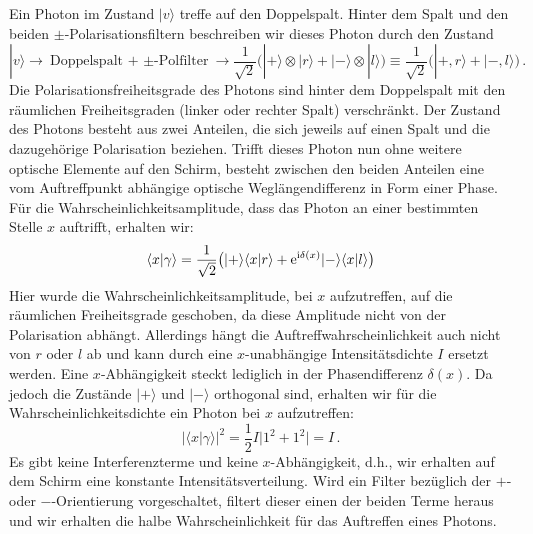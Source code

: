 Ein Photon im Zustand $|v\rangle$ treffe auf den Doppelspalt. Hinter dem Spalt und den beiden
$\pm$-Polarisationsfiltern beschreiben wir dieses Photon durch den Zustand
\begin{equation}
\label{eq_DSsingle1}
          |v \rangle \longrightarrow \mbox{Doppelspalt + $\pm$-Polfilter} \longrightarrow 
              \frac{1}{\sqrt{2}} \big(  |+\rangle \otimes |r\rangle + |-\rangle \otimes |l\rangle \big) 
              \equiv \frac{1}{\sqrt{2}} \big(  |+ , r\rangle + |- , l\rangle \big)   \, .
\end{equation}
Die Polarisationsfreiheitsgrade des Photons sind hinter dem Doppelspalt mit den
r\"aumlichen Freiheitsgraden (linker oder rechter Spalt) verschr\"ankt. Der Zustand des Photons
besteht aus zwei Anteilen, die sich jeweils auf einen Spalt und die dazugeh\"orige Polarisation
beziehen. Trifft dieses Photon nun ohne weitere optische Elemente auf den Schirm,
besteht zwischen den beiden Anteilen eine vom Auftreffpunkt abh\"angige optische 
Wegl\"angendifferenz in Form einer Phase. F\"ur die Wahr\-schein\-lich\-keits\-ampli\-tude, dass das Photon
an einer bestimmten Stelle $x$ auftrifft, erhalten wir:
\begin{equation}
\label{eq_DSsingle2}
   \langle x | \gamma \rangle = \frac{1}{\sqrt{2}}
               \big(  |+ \rangle \langle x | r\rangle +{\rm e}^{{\rm i}\delta(x)} |- \rangle \langle x  | l\rangle \big)
\end{equation}
Hier wurde die Wahrscheinlichkeitsamplitude, bei $x$ aufzutreffen, auf die r\"aumlichen Freiheitsgrade 
geschoben, da diese Amplitude nicht von der Polarisation abh\"angt. Allerdings h\"angt die
Auftreffwahrscheinlichkeit auch nicht von $r$ oder $l$ ab und kann durch eine $x$-unabh\"angige
Intensit\"atsdichte $I$ ersetzt werden. Eine $x$-Abh\"angigkeit steckt lediglich in der
Phasendifferenz $\delta(x)$. Da jedoch die Zust\"ande $|+\rangle$ und $|-\rangle$
orthogonal sind, erhalten wir f\"ur die Wahrscheinlichkeitsdichte ein Photon bei $x$ aufzutreffen:
\begin{equation}
  | \langle x | \gamma \rangle |^2 =  \frac{1}{2}  I  \big| 1^2 +1^2 \big|  = I \, .
\end{equation}
Es gibt keine Interferenzterme und keine $x$-Abh\"angigkeit, d.h., wir erhalten auf dem Schirm eine 
konstante Intensit\"atsverteilung. Wird ein Filter bez\"uglich der $+$- oder
$-$-Orientierung vorgeschaltet, filtert dieser einen der beiden Terme heraus und wir erhalten die halbe
Wahrscheinlichkeit f\"ur das Auftreffen eines Photons. 

